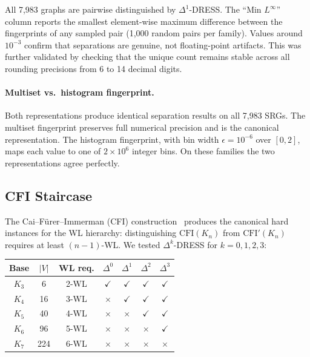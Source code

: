 \documentclass[11pt,a4paper]{article}
\begin{document}
All 7{,}983 graphs are pairwise distinguished by $\Delta^1$-DRESS. The ``Min $L^\infty$'' column reports the smallest element-wise maximum difference between the fingerprints of any sampled pair (1{,}000 random pairs per family). Values around $10^{-3}$ confirm that separations are genuine, not floating-point artifacts. This was further validated by checking that the unique count remains stable across all rounding precisions from 6 to 14 decimal digits.

\paragraph{Multiset vs.\ histogram fingerprint.} Both representations produce identical separation results on all 7{,}983 SRGs. The multiset fingerprint preserves full numerical precision and is the canonical representation. The histogram fingerprint, with bin width $\epsilon = 10^{-6}$ over $[0,2]$, maps each value to one of $2 \times 10^{6}$ integer bins. On these families the two representations agree perfectly.

\subsection{CFI Staircase}
\label{sec:cfi-results}

The Cai--F\"{u}rer--Immerman (CFI) construction~\cite{cai1992optimal} produces the canonical hard instances for the WL hierarchy: distinguishing $\text{CFI}(K_n)$ from $\text{CFI}'(K_n)$ requires at least $(n{-}1)$-WL. We tested $\Delta^k$-DRESS for $k = 0, 1, 2, 3$:

\begin{center}
\begin{tabular}{ccccccc}
\textbf{Base} & \textbf{$|V|$} & \textbf{WL req.} & $\Delta^0$ & $\Delta^1$ & $\Delta^2$ & $\Delta^3$ \\
\hline
$K_3$    & 6    & 2-WL & $\checkmark$ & $\checkmark$ & $\checkmark$ & $\checkmark$ \\
$K_4$    & 16   & 3-WL & $\times$     & $\checkmark$ & $\checkmark$ & $\checkmark$ \\
$K_5$    & 40   & 4-WL & $\times$     & $\times$     & $\checkmark$ & $\checkmark$ \\
$K_6$    & 96   & 5-WL & $\times$     & $\times$     & $\times$     & $\checkmark$ \\
$K_7$    & 224  & 6-WL & $\times$     & $\times$     & $\times$     & $\times$     \\
\end{tabular}
\end{center}
\end{document}
